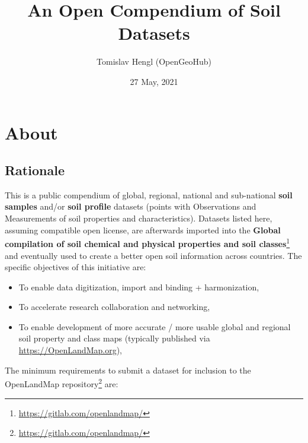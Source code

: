 \documentclass[
  graybox,natbib,nospthms]{svmono}
\title{An Open Compendium of Soil Datasets}
\author{Tomislav Hengl (OpenGeoHub)}
\date{27 May, 2021}
\providecommand{\tightlist}{%
  \setlength{\itemsep}{0pt}\setlength{\parskip}{0pt}}
\providecommand{\tightlist}{\setlength{\itemsep}{0pt}\setlength{\parskip}{0pt}}
\renewcommand{\href}[2]{#2 (\url{#1})}
\renewcommand{\href}[2]{#2\footnote{\url{#1}}}
\begin{document}
\maketitle

\thispagestyle{empty}
\begin{center}
\end{center}

\setlength{\abovedisplayskip}{-5pt}
\setlength{\abovedisplayshortskip}{-5pt}

{
\hypersetup{linkcolor=}
\setcounter{tocdepth}{1}
\tableofcontents
}
\hypertarget{about}{%
\chapter{About}\label{about}}

\hypertarget{rationale}{%
\section{Rationale}\label{rationale}}

This is a public compendium of global, regional, national and
sub-national \textbf{soil samples} and/or \textbf{soil profile} datasets (points with
Observations and Measurements of soil properties and characteristics).
Datasets listed here, assuming compatible open license, are afterwards
imported into the \href{https://gitlab.com/openlandmap/}{\textbf{Global compilation of soil chemical and physical
properties and soil classes}} and
eventually used to create a better open soil information across countries.
The specific objectives of this initiative are:

\begin{itemize}
\tightlist
\item
  To enable data digitization, import and binding + harmonization,\\
\item
  To accelerate research collaboration and networking,\\
\item
  To enable development of more accurate / more usable global and
  regional soil property and class maps (typically published via
  \url{https://OpenLandMap.org}),
\end{itemize}

The minimum requirements to submit a dataset for inclusion to \href{https://gitlab.com/openlandmap/}{the
OpenLandMap repository} are:
\end{document}
